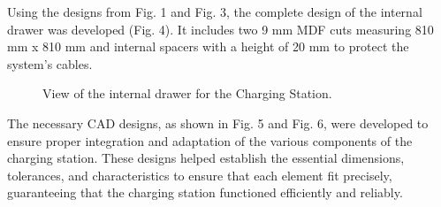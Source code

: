 Using the designs from Fig. 1 and Fig. 3, the complete design of the internal drawer was developed (Fig. 4). It includes two 9 mm MDF cuts measuring 810 mm x 810 mm and internal spacers with a height of 20 mm to protect the system's cables. 

        \begin{figure}[H]
            \centering
            \caption{View of the internal drawer for the Charging Station.}
            \label{fig:etiqueta}
        \end{figure}

The necessary CAD designs, as shown in Fig. 5 and Fig. 6, were developed to ensure proper integration and adaptation of the various components of the charging station. These designs helped establish the essential dimensions, tolerances, and characteristics to ensure that each element fit precisely, guaranteeing that the charging station functioned efficiently and reliably.

